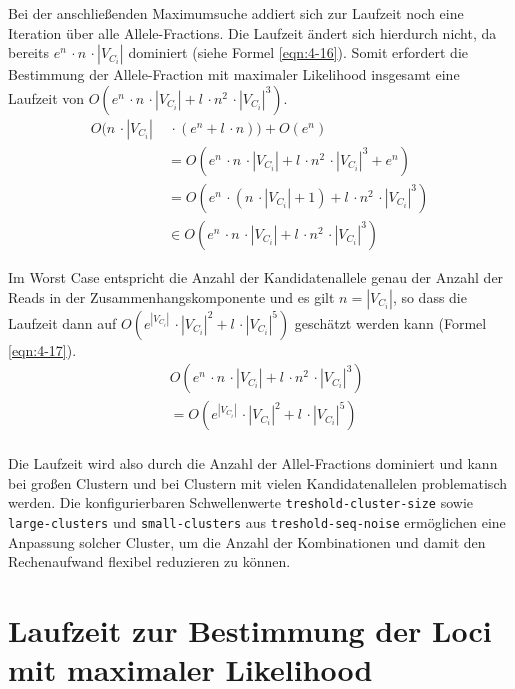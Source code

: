 Bei der anschließenden Maximumsuche addiert sich zur Laufzeit noch eine Iteration über alle Allele-Fractions. Die Laufzeit ändert sich hierdurch nicht, da bereits $e^n\, \cdotp n\, \cdotp |V_{C_{i}}|$ dominiert (siehe Formel \eqref{eqn:4-16}). Somit erfordert die Bestimmung der Allele-Fraction mit maximaler Likelihood insgesamt eine Laufzeit von $ O( e^n\, \cdotp n\, \cdotp |V_{C_{i}}| + l\, \cdotp n^2\, \cdotp |V_{C_{i}}|^3) $.
\begin{equation} \label{eqn:4-16}
\tag{4-16}
\begin{aligned}
 O( n \, \cdotp |V_{C_{i}}| &\ {} \,\cdotp (e^n + l \, \cdotp n)) + O(e^n) \\
&\ = O( e^n \, \cdotp n \, \cdotp |V_{C_{i}}| + l \, \cdotp n^2 \, \cdotp |V_{C_{i}}|^3 + e^n)\\
&\ = O( e^n \,\cdotp ( n \, \cdotp |V_{C_{i}}| + 1) + l \, \cdotp n^2 \, \cdotp |V_{C_{i}}|^3) \\
& \ \in O( e^n \, \cdotp n\, \cdotp |V_{C_{i}}| + l\, \cdotp n^2\, \cdotp |V_{C_{i}}|^3) 
\end{aligned}
\end{equation}

Im Worst Case entspricht die Anzahl der Kandidatenallele genau der Anzahl der Reads in der Zusammenhangskomponente und es gilt $ n = |V_{C_{i}}| $, so dass die Laufzeit dann auf $  O( e^{|V_{C_{i}}|} \, \cdotp  |V_{C_{i}}|^2 + l \, \cdotp |V_{C_{i}}|^5) $ geschätzt werden kann (Formel \eqref{eqn:4-17}).
\begin{equation} \label{eqn:4-17}
\tag{4-17}
\begin{aligned}
&\ {} O( e^n\, \cdotp n \, \cdotp |V_{C_{i}}| + l \, \cdotp n^2 \, \cdotp |V_{C_{i}}|^3) \\
&\ {} = O( e^{|V_{C_{i}}|} \, \cdotp  |V_{C_{i}}|^2 + l \, \cdotp |V_{C_{i}}|^5)\\
\end{aligned}
\end{equation}

Die Laufzeit wird also durch die Anzahl der Allel-Fractions dominiert und kann bei großen Clustern und bei Clustern mit vielen Kandidatenallelen problematisch werden. Die konfigurierbaren Schwellenwerte \lstinline|treshold-cluster-size| sowie \lstinline|large-clusters| und \lstinline|small-clusters| aus \lstinline|treshold-seq-noise| ermöglichen eine Anpassung solcher Cluster, um die Anzahl der Kombinationen und damit den Rechenaufwand flexibel reduzieren zu können.


\section[Laufzeit der Loci-Zuordnung]{Laufzeit zur Bestimmung der Loci mit maximaler Likelihood}

